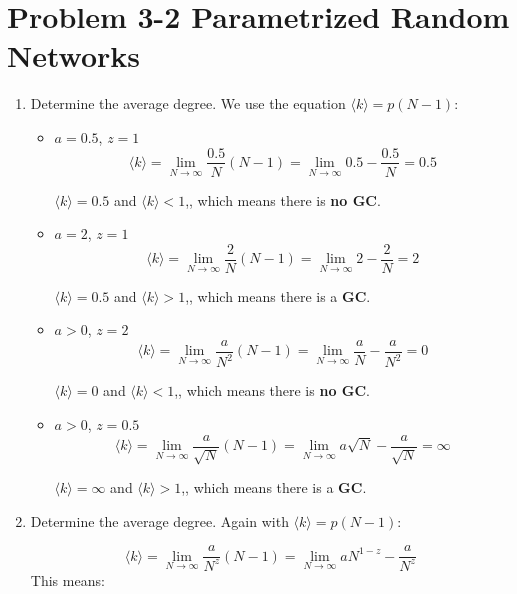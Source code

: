 \section{Problem 3-2 Parametrized Random Networks}
\begin{enumerate}
	\item Determine the average degree.
	We use the equation $\langle k \rangle = p(N-1)$:
	\begin{itemize}
		\item $a=0.5$,  $z=1$
			\begin{equation}
				\langle k \rangle = \lim\limits_{N \rightarrow \infty} \frac{0.5}{N}(N-1) =\lim\limits_{N \rightarrow \infty} 0.5 - \frac{0.5}{N} = 0.5
			\end{equation}
			
			$\langle k \rangle = 0.5$ and $\langle k \rangle < 1$,, which means there is \textbf{no GC}. 
		\item $a=2$,  $z=1$
			\begin{equation}
				\langle k \rangle = \lim\limits_{N \rightarrow \infty} \frac{2}{N}(N-1) =\lim\limits_{N \rightarrow \infty} 2 - \frac{2}{N} = 2
			\end{equation}
			
			$\langle k \rangle = 0.5$ and $\langle k \rangle > 1$,, which means there is a \textbf{GC}. 
		\item $a>0$,  $z=2$
			\begin{equation}
				\langle k \rangle = \lim\limits_{N \rightarrow \infty} \frac{a}{N^2}(N-1) =\lim\limits_{N \rightarrow \infty} \frac{a}{N} - \frac{a}{N^2} = 0
			\end{equation}
			
			$\langle k \rangle = 0$ and $\langle k \rangle < 1$,, which means there is \textbf{no GC}. 
		\item $a>0$,  $z=0.5$
			\begin{equation}
				\langle k \rangle = \lim\limits_{N \rightarrow \infty} \frac{a}{\sqrt{N}}(N-1) =\lim\limits_{N \rightarrow \infty} a\sqrt{N} - \frac{a}{\sqrt{N}} = \infty
			\end{equation}
			
			$\langle k \rangle = \infty$ and $\langle k \rangle > 1$,, which means there is a \textbf{GC}. 
	\end{itemize}
	
	\item Determine the average degree.
	Again with $\langle k \rangle = p(N-1)$:
	
	\begin{equation}
		\langle k \rangle = \lim\limits_{N \rightarrow \infty} \frac{a}{N^z}(N-1) = \lim\limits_{N \rightarrow \infty} aN^{1-z} - \frac{a}{N^z}
	\end{equation}
	This means:
  

\end{enumerate}
